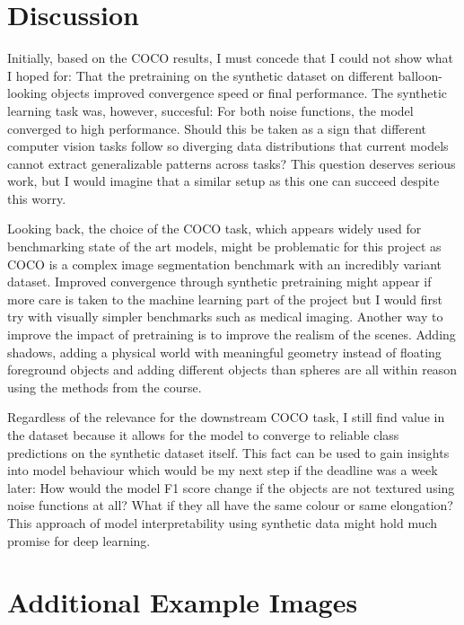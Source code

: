 \documentclass[12pt,fleqn]{article}
\begin{document}
\section{Discussion}%
\label{sec:disc}
Initially, based on the COCO results, I must concede that I could not show what I hoped for:
That the pretraining on the synthetic dataset on different balloon-looking objects improved convergence speed or final performance.
The synthetic learning task was, however, succesful:
For both noise functions, the model converged to high performance.
Should this be taken as a sign that different computer vision tasks follow so diverging data distributions that current models cannot extract generalizable patterns across tasks?
This question deserves serious work, but I would imagine that a similar setup as this one can succeed despite this worry.

Looking back, the choice of the COCO task, which appears widely used for benchmarking state of the art models, might be problematic for this project as COCO is a complex image segmentation benchmark with an incredibly variant dataset.
Improved convergence through synthetic pretraining might appear if more care is taken to the machine learning part of the project but I would first try with visually simpler benchmarks such as medical imaging.
Another way to improve the impact of pretraining is to improve the realism of the scenes.
Adding shadows, adding a physical world with meaningful geometry instead of floating foreground objects and adding different objects than spheres are all within reason using the methods from the course.

Regardless of the relevance for the downstream COCO task, I still find value in the dataset because it allows for the model to converge to reliable class predictions on the synthetic dataset itself.
This fact can be used to gain insights into model behaviour which would be my next step if the deadline was a week later:
How would the model F1 score change if the objects are not textured using noise functions at all?
What if they all have the same colour or same elongation?
This approach of model interpretability using synthetic data might hold much promise for deep learning.

\clearpage

\printbibliography[heading=bibintoc]

\clearpage

\appendix
\section{Additional Example Images}
\end{document}
